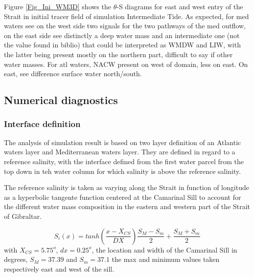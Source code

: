 Figure \ref{Fig_Ini_WM3D} shows the $\theta$-S diagrams for east and west entry of the Strait in initial tracer field of simulation Intermediate Tide. As expected, for med waters see on the west side two signals for the two pathways of the med outflow, on the east side see distinctly a deep water mass and an intermediate one (not the value found in biblio) that could be interpreted as WMDW and LIW, with the latter being present mostly on the northern part, difficult to say if other water masses. For atl waters, NACW present on west of domain, less on east. On east, see difference surface water north/south.




\subsection{Numerical diagnostics}


\subsubsection{Interface definition}

The analysis of simulation result is based on two layer definition of an Atlantic waters layer and Mediterranean waters layer. They are defined in regard to a reference salinity, with the interface defined from the first water parcel from the top down in teh water column for which salinity is above the reference salinity.

The reference salinity is taken as varying along the Strait in function of longitude as a hyperbolic tangente function centered at the Camarinal Sill to account for the different water mass composition in the eastern and western part of the Strait of Gibraltar. %



\begin{equation}
	S_i(x)=tanh(\frac{x-X_{CS}}{DX})\frac{S_M-S_m}{2}+\frac{S_M+S_m}{2}
\end{equation}
with $X_{CS}=5.75^o$, $dx=0.25^o$, the location and width of the Camarinal Sill in degrees, $S_M=37.39$ and $S_m=37.1$ the max and minimum values taken respectively east and west of the sill.

